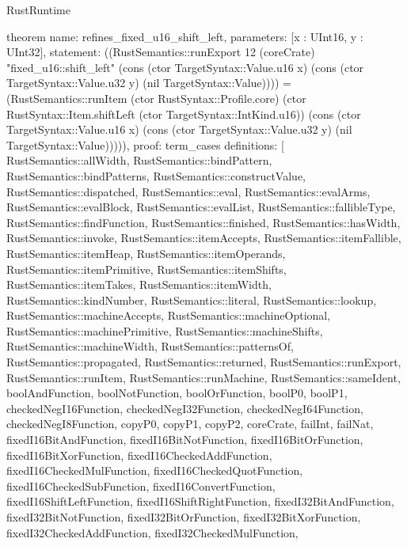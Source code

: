 \begin{lexlean}{RustRuntime}
\begin{semanticmodule}
theorem{
  name: refines_fixed_u16_shift_left,
  parameters: [x : UInt16, y : UInt32],
  statement: ((RustSemantics::runExport 12 (coreCrate) "fixed_u16::shift_left" (cons (ctor TargetSyntax::Value.u16 x) (cons (ctor TargetSyntax::Value.u32 y) (nil TargetSyntax::Value)))) = (RustSemantics::runItem (ctor RustSyntax::Profile.core) (ctor RustSyntax::Item.shiftLeft (ctor TargetSyntax::IntKind.u16)) (cons (ctor TargetSyntax::Value.u16 x) (cons (ctor TargetSyntax::Value.u32 y) (nil TargetSyntax::Value))))),
  proof: term_cases{
    definitions: [
      RustSemantics::allWidth,
      RustSemantics::bindPattern,
      RustSemantics::bindPatterns,
      RustSemantics::constructValue,
      RustSemantics::dispatched,
      RustSemantics::eval,
      RustSemantics::evalArms,
      RustSemantics::evalBlock,
      RustSemantics::evalList,
      RustSemantics::fallibleType,
      RustSemantics::findFunction,
      RustSemantics::finished,
      RustSemantics::hasWidth,
      RustSemantics::invoke,
      RustSemantics::itemAccepts,
      RustSemantics::itemFallible,
      RustSemantics::itemHeap,
      RustSemantics::itemOperands,
      RustSemantics::itemPrimitive,
      RustSemantics::itemShifts,
      RustSemantics::itemTakes,
      RustSemantics::itemWidth,
      RustSemantics::kindNumber,
      RustSemantics::literal,
      RustSemantics::lookup,
      RustSemantics::machineAccepts,
      RustSemantics::machineOptional,
      RustSemantics::machinePrimitive,
      RustSemantics::machineShifts,
      RustSemantics::machineWidth,
      RustSemantics::patternsOf,
      RustSemantics::propagated,
      RustSemantics::returned,
      RustSemantics::runExport,
      RustSemantics::runItem,
      RustSemantics::runMachine,
      RustSemantics::sameIdent,
      boolAndFunction,
      boolNotFunction,
      boolOrFunction,
      boolP0,
      boolP1,
      checkedNegI16Function,
      checkedNegI32Function,
      checkedNegI64Function,
      checkedNegI8Function,
      copyP0,
      copyP1,
      copyP2,
      coreCrate,
      failInt,
      failNat,
      fixedI16BitAndFunction,
      fixedI16BitNotFunction,
      fixedI16BitOrFunction,
      fixedI16BitXorFunction,
      fixedI16CheckedAddFunction,
      fixedI16CheckedMulFunction,
      fixedI16CheckedQuotFunction,
      fixedI16CheckedSubFunction,
      fixedI16ConvertFunction,
      fixedI16ShiftLeftFunction,
      fixedI16ShiftRightFunction,
      fixedI32BitAndFunction,
      fixedI32BitNotFunction,
      fixedI32BitOrFunction,
      fixedI32BitXorFunction,
      fixedI32CheckedAddFunction,
      fixedI32CheckedMulFunction,
}}
\end{semanticmodule}
\end{lexlean}
